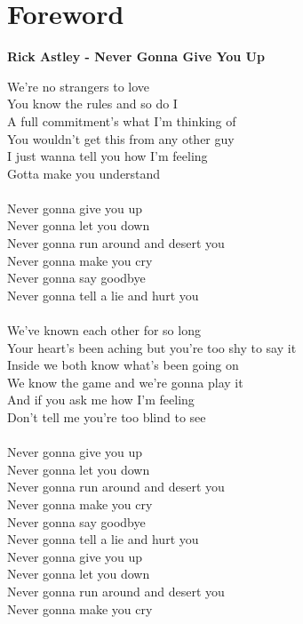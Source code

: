 \documentclass{42-en}
\begin{document}
\chapter{Foreword}
\begin{center}
	\textbf{Rick Astley - Never Gonna Give You Up}
\end{center}
We're no strangers to love\\
    You know the rules and so do I\\
    A full commitment's what I'm thinking of\\
    You wouldn't get this from any other guy\\
    I just wanna tell you how I'm feeling\\
    Gotta make you understand\\
    \\
    Never gonna give you up\\
    Never gonna let you down\\
    Never gonna run around and desert you\\
    Never gonna make you cry\\
    Never gonna say goodbye\\
    Never gonna tell a lie and hurt you\\
    \\
    We've known each other for so long\\
    Your heart's been aching but you're too shy to say it\\
    Inside we both know what's been going on\\
    We know the game and we're gonna play it\\
    And if you ask me how I'm feeling\\
    Don't tell me you're too blind to see\\
    \\
    Never gonna give you up\\
    Never gonna let you down\\
    Never gonna run around and desert you\\
    Never gonna make you cry\\
    Never gonna say goodbye\\
    Never gonna tell a lie and hurt you\\
    Never gonna give you up\\
    Never gonna let you down\\
    Never gonna run around and desert you\\
    Never gonna make you cry\\
\end{document}
